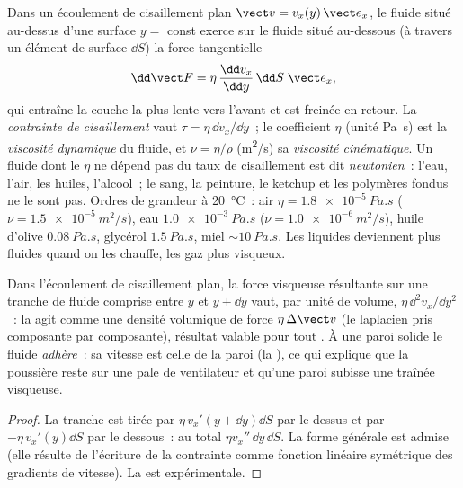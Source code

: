 \begin{definition}\label{def:b2:viscous-flows:viscosity}
Dans un écoulement de cisaillement plan $\vect v = v_x(y)\,\vect e_x$, le fluide situé au-dessus d'une
surface $y = $ const exerce sur le fluide situé au-dessous (à travers un élément
de surface $\dd S$) la force tangentielle
\[
\dd\vect F = \eta\,\frac{\dd v_x}{\dd y}\,\dd S\;\vect e_x ,
\]
qui entraîne la couche la plus lente vers l'avant et est freinée en retour.
La \emph{contrainte de cisaillement} vaut $\tau = \eta\,\dd v_x/\dd y$~; le coefficient
$\eta$ (unité \unit{Pa.s}) est la \emph{viscosité dynamique} du fluide,
et $\nu = \eta/\rho$ (\unit{m^2/s}) sa \emph{viscosité cinématique}. Un fluide
dont le $\eta$ ne dépend pas du taux de cisaillement est dit \emph{newtonien}~:
l'eau, l'air, les huiles, l'alcool~; le sang, la peinture, le ketchup et les polymères fondus ne le
sont pas. Ordres de grandeur à \qty{20}{\degreeCelsius}~: air $\eta =
\qty{1.8e-5}{Pa.s}$ ($\nu = \qty{1.5e-5}{m^2/s}$), eau $\qty{1.0e-3}{Pa.s}$
($\nu = \qty{1.0e-6}{m^2/s}$), huile d'olive $\qty{0.08}{Pa.s}$, glycérol
$\qty{1.5}{Pa.s}$, miel $\sim\qty{10}{Pa.s}$. Les liquides deviennent plus fluides quand on les
chauffe, les gaz plus visqueux.
\end{definition}

\begin{proposition}\label{prop:b2:viscous-flows:density}
Dans l'écoulement de cisaillement plan, la force visqueuse résultante sur une tranche de fluide
comprise entre $y$ et $y + \dd y$ vaut, par unité de volume, $\eta\,\dd^2v_x/\dd y^2$~:
la  agit comme une densité volumique de force $\eta\,\Delta\vect v$ (le
laplacien pris composante par composante), résultat valable pour tout
. À une paroi solide le fluide \emph{adhère}~: sa
vitesse est celle de la paroi (la \emph{}), ce qui explique que
la poussière reste sur une pale de ventilateur et qu'une paroi subisse une traînée visqueuse.
\end{proposition}

\begin{proof}
La tranche est tirée par $\eta\,v_x'(y + \dd y)\dd S$ par le dessus et par
$-\eta\,v_x'(y)\dd S$ par le dessous~: au total $\eta v_x''\,\dd y\,\dd S$. La forme
générale est admise (elle résulte de l'écriture de la contrainte comme fonction linéaire
symétrique des gradients de vitesse). La  est
expérimentale.
\end{proof}

